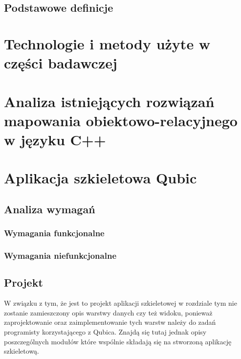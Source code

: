 \documentclass[12pt]{report}
\begin{document}

\section{Podstawowe definicje} %

\chapter{Technologie i metody użyte w części badawczej} \label{technologie} %

\chapter[Analiza istniejących rozwiązań]{Analiza istniejących rozwiązań mapowania obiektowo-relacyjnego w języku C++} \label{analiza}

\chapter{Aplikacja szkieletowa Qubic} \label{qubic}

\section{Analiza wymagań}

\subsection{Wymagania funkcjonalne}

\subsection{Wymagania niefunkcjonalne}

\section{Projekt} %

W związku z tym, że jest to projekt aplikacji szkieletowej w rozdziale tym nie zostanie zamieszczony opis warstwy danych czy też widoku, ponieważ zaprojektowanie oraz
zaimplementowanie tych warstw należy do zadań programisty ko\-rzy\-sta\-ją\-cego z Qubica. Znajdą się tutaj jednak opisy poszczególnych modułów które wspólnie składają się
na stworzoną aplikację szkieletową.
\end{document}
